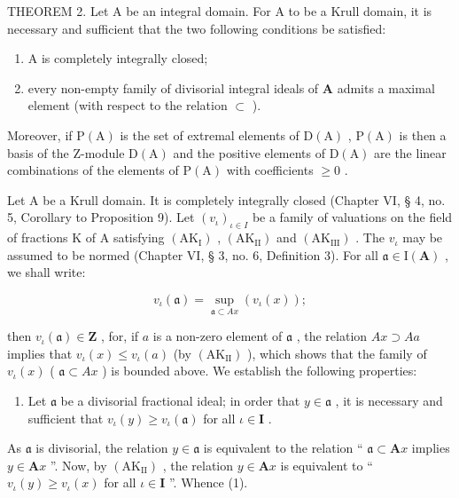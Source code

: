 THEOREM 2. Let A be an integral domain. For A to be a Krull domain, it is necessary and sufficient that the two following conditions be satisfied:

\begin{enumerate}
\def\labelenumi{(\alph{enumi})}
\item
  A is completely integrally closed;
\item
  every non-empty family of divisorial integral ideals of \(\mathbf{A}\) admits a maximal element (with respect to the relation \(\subset\) ).
\end{enumerate}

Moreover, if \(\mathrm{P}(\mathrm{A})\) is the set of extremal elements of \(\mathrm{D}(\mathrm{A})\) , \(\mathrm{P}(\mathrm{A})\) is then a basis of the Z-module \(\mathrm{D}(\mathrm{A})\) and the positive elements of \(\mathrm{D}(\mathrm{A})\) are the linear combinations of the elements of \(\mathrm{P}(\mathrm{A})\) with coefficients \(\geqslant0\) .

Let A be a Krull domain. It is completely integrally closed (Chapter VI, § 4, no. 5, Corollary to Proposition 9). Let \((v_{\iota})_{\iota\in I}\) be a family of valuations on the field of fractions K of A satisfying \((\mathrm{AK}_{\mathrm{I}})\) , \((\mathrm{AK}_{\mathrm{II}})\) and \((\mathrm{AK}_{\mathrm{III}})\) . The \(v_{\iota}\) may be assumed to be normed (Chapter VI, § 3, no. 6, Definition 3). For all \(\mathfrak{a} \in \mathrm{I}(\mathbf{A})\) , we shall write:

\[
v _ {\iota} (\mathfrak{a}) = \sup _ {\mathfrak{a} \subset Ax} (v _ {\iota} (x));\tag{3}
\]

then \(v_{\iota}(\mathfrak{a}) \in \mathbf{Z}\) , for, if \(a\) is a non-zero element of \(\mathfrak{a}\) , the relation \(Ax \supset Aa\) implies that \(v_{\iota}(x) \leqslant v_{\iota}(a)\) (by \((\mathrm{AK}_{\mathrm{II}})\) ), which shows that the family of \(v_{\iota}(x)\) ( \(\mathfrak{a} \subset Ax\) ) is bounded above. We establish the following properties:

\begin{enumerate}
\def\labelenumi{(\arabic{enumi})}
\tightlist
\item
  Let \(\mathfrak{a}\) be a divisorial fractional ideal; in order that \(y \in \mathfrak{a}\) , it is necessary and sufficient that \(v_{\iota}(y) \geqslant v_{\iota}(\mathfrak{a})\) for all \(\iota \in \mathbf{I}\) .
\end{enumerate}

As \(\mathfrak{a}\) is divisorial, the relation \(y \in \mathfrak{a}\) is equivalent to the relation `` \(\mathfrak{a} \subset \mathbf{A}x\) implies \(y \in \mathbf{A}x\) ''. Now, by \((\mathrm{AK}_{\mathrm{II}})\) , the relation \(y \in \mathbf{A}x\) is equivalent to `` \(v_{\iota}(y) \geqslant v_{\iota}(x)\) for all \(\iota \in \mathbf{I}\) ''. Whence (1).

